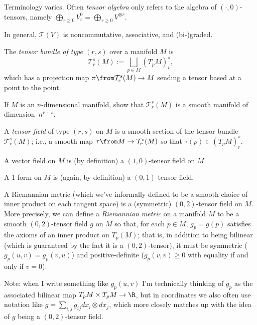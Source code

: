 \begin{remark}
	Terminology varies. Often \emph{tensor algebra} only refers to the algebra of $(\cdot , 0 )$-tensors, namely $\displaystyle \bigoplus_{r\geq 0} V_r^0 = \bigoplus_{r\geq 0} V^{\otimes r}$.
\end{remark}

In general, $\mathcal{T}(V)$ is noncommutative, associative, and (bi-)graded.

\begin{definition}\label{def:tensor bundle}
	The \emph{tensor bundle of type $(r,s)$} over a manifold $M$ is
	\[
		\mathcal{T}_r^s(M) := \bigsqcup_{p \in M} \left(T_pM\right)_r^s,
	\]
	which has a projection map $\pi\from \mathcal{T}_r^s(M) \to M$ sending a tensor based at a point to the point. 
	
\begin{exercise}
	If $M$ is an $n$-dimensional manifold, show that $\mathcal{T}_r^s(M)$ is a smooth manifold of dimension~$n^{r+s}$. 
\end{exercise}
	
	A \emph{tensor field} of type $(r,s)$ on $M$ is a smooth section of the tensor bundle $\mathcal{T}_r^s(M)$; i.e., a smooth map $\tau\from M \to \mathcal{T}_r^s(M)$ so that $\tau(p) \in \left(T_p M\right)_r^s$.
\end{definition}

\begin{example}
	A vector field on $M$ is (by definition) a $(1,0)$-tensor field on $M$.
\end{example}

\begin{example}
	A 1-form on $M$ is (again, by definition) a $(0,1)$-tensor field.
\end{example}

\begin{example}
	A Riemannian metric (which we've informally defined to be a smooth choice of inner product on each tangent space) is a (symmetric) $(0,2)$-tensor field on $M$. More precisely, we can define a \emph{Riemannian metric} on a manifold $M$ to be a smooth $(0,2)$-tensor field $g$ on $M$ so that, for each $p \in M$, $g_p = g(p)$ satisfies the axioms of an inner product on $T_p(M)$; that is, in addition to being bilinear (which is guaranteed by the fact it is a $(0,2)$-tensor), it must be symmetric ($g_p(u,v) = g_p(v,u)$) and positive-definite ($g_p(v,v) \geq 0$ with equality if and only if $v=0$).
	
	Note: when I write something like $g_p(u,v)$ I'm technically thinking of $g_p$ as the associated bilinear map $T_pM \times T_pM \to \R$, but in coordinates we also often use notation like $g = \sum_{i,j} g_{ij} dx_i \otimes dx_j$, which more closely matches up with the idea of $g$ being a $(0,2)$-tensor field.
\end{example}

